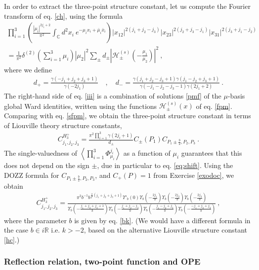 \documentclass[12pt, a4paper, notitlepage, twoside]{report}
\numberwithin{equation}{section}
\theoremstyle{break}
\begin{document}
In order to extract the three-point structure constant, let us compute the Fourier transform of eq. \eqref{ch}, using the formula \cite{rt05}
\begin{multline}
 \prod_{i=1}^3\left(\frac{|\mu_i|^{2j_i+2}}{\pi^2}\int_{{\mathbb{C}}}d^2x_i\ e^{-\mu_ix_i+\bar{\mu}_i\bar{x}_i}\right)
|x_{12}|^{2(j_1+j_2-j_3)} |x_{23}|^{2(j_2+j_3-j_1)} |x_{31}|^{2(j_3+j_1-j_2)} 
\\
= \frac{1}{\pi^2}\delta^{(2)}(\textstyle{\sum}_{i=1}^3\mu_i)|\mu_2|^2 \sum_\pm d_\pm \left|\mathcal{H}^{(s)}_\pm(-\tfrac{\mu_1}{\mu_2})\right|^2 \ ,
\label{iii}
\end{multline}
where we define 
\begin{align}
 d_+ = \frac{\gamma(-j_1+j_2+j_3+1)}{\gamma(-2j_1)} \quad , \quad d_- = \frac{\gamma(j_1+j_2-j_3+1)\gamma(j_1-j_2+j_3+1)}{\gamma(-j_1-j_2-j_3-1)\gamma(2j_1+2)}\ .
\end{align}
The right-hand side of eq. \eqref{iii} is a combination of solutions \eqref{pmf} of the $\mu$-basis global Ward identities, written using the functions $\mathcal{H}^{(s)}_\pm(x)$ of eq. \eqref{fpm}.
Comparing with eq. \eqref{sfpm}, we obtain the three-point structure constant in terms of Liouville theory structure constants,
\begin{align}
 C^{H_3^+}_{j_1,j_2,j_3} = \frac{\pi^2\prod_{i=1}^3\gamma(2j_i+1)}{d_\pm}C_{\pm}(P_1)C_{P_1\pm \frac{b}{2},P_2,P_3}\ .
\end{align}
The single-valuedness of $\left\langle \prod_{i=1}^3\Phi^{j_i}_{\mu_i} \right\rangle $ as a function of $\mu_i$ guarantees that this does not depend on the sign $\pm$, due in particular to eq. \eqref{eq:shift}. 
Using the DOZZ formula for $C_{P_1\pm \frac{b}{2},P_2,P_3}$, and $C_+(P)=1$ from Exercise \ref{exodoc}, we obtain
\begin{align}
\boxed{C^{H_3^+}_{j_1,j_2,j_3} = \frac{\pi^2b^{-1}b^{\frac{2}{b^2}(j_1+j_2+j_3+1)} \Upsilon'_b(0)\Upsilon_b(-\frac{2j_1}{b})\Upsilon_b(-\frac{2j_2}{b})\Upsilon_b(-\frac{2j_3}{b})}
{\Upsilon_b(-\frac{j_1+j_2+j_3+1}{b})\Upsilon_b(-\frac{j_1+j_2-j_3}{b}) \Upsilon_b(-\frac{j_1-j_2+j_3}{b})\Upsilon_b(-\frac{-j_1+j_2+j_3}{b})}}\ ,
\label{chp}
\end{align}
where the parameter $b$ is given by eq. \eqref{bk}.
(We would have a different formula in the case $b\in i\mathbb{R}$ i.e. $k>-2$, based on the alternative Liouville structure constant \eqref{hc}.)


\subsubsection{Reflection relation, two-point function and OPE}
\end{document}
